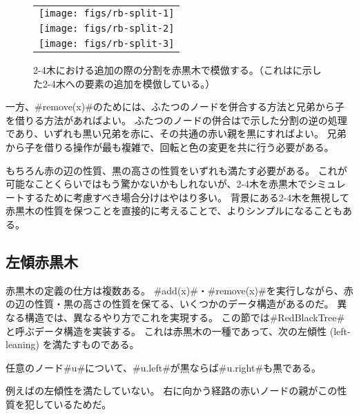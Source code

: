 \begin{figure}
  \begin{center}
   \begin{tabular}{c}
     \texttt{[image: figs/rb-split-1]} \\
     \texttt{[image: figs/rb-split-2]} \\
     \texttt{[image: figs/rb-split-3]} \\
   \end{tabular}
  \end{center}
  \caption{2-4木における追加の際の分割を赤黒木で模倣する。（これはに示した2-4木への要素の追加を模倣している。）}
\end{figure}

一方、#remove(x)#のためには、ふたつのノードを併合する方法と兄弟から子を借りる方法があればよい。
ふたつのノードの併合はで示した分割の逆の処理であり、いずれも黒い兄弟を赤に、その共通の赤い親を黒にすればよい。
兄弟から子を借りる操作が最も複雑で、回転と色の変更を共に行う必要がある。

もちろん赤の辺の性質、黒の高さの性質をいずれも満たす必要がある。
これが可能なことくらいではもう驚かないかもしれないが、2-4木を赤黒木でシミュレートするために考慮すべき場合分けはやはり多い。
背景にある2-4木を無視して赤黒木の性質を保つことを直接的に考えることで、よりシンプルになることもある。

\subsection{左傾赤黒木}

%
%
赤黒木の定義の仕方は複数ある。
#add(x)#・#remove(x)#を実行しながら、赤の辺の性質・黒の高さの性質を保てる、いくつかのデータ構造があるのだ。
異なる構造では、異なるやり方でこれを実現する。
この節では#RedBlackTree#と呼ぶデータ構造を実装する。
%
これは赤黒木の一種であって、次の左傾性 (left-leaning) を満たすものである。
\begin{prp}[左傾性]
  任意のノード#u#について、#u.left#が黒ならば#u.right#も黒である。
\end{prp}
例えばの左傾性を満たしていない。
右に向かう経路の赤いノードの親がこの性質を犯しているためだ。

